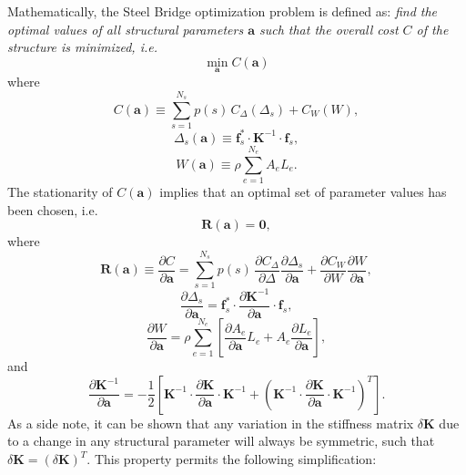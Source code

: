 \documentclass[12pt,a4paper,article]{memoir} %
\begin{document}
Mathematically, the Steel Bridge optimization problem is defined as: \textit{find the optimal values of all structural parameters $\mathbf{a}$ such that the overall cost $C$ of the structure is minimized, i.e.}
\begin{equation}
        \min_{\mathbf{a}} C(\mathbf{a})
\end{equation}
where
\begin{equation}
        C(\mathbf{a}) \equiv \sum_{s=1}^{N_s} p(s) \, C_{\Delta} (\Delta_s) + C_W (W),
\end{equation}
\begin{equation}
        \Delta_s (\mathbf{a}) \equiv \mathbf{f}^*_s \cdot \mathbf{K}^{-1} \cdot \mathbf{f}_s,
\end{equation}
\begin{equation}
        W (\mathbf{a}) \equiv \rho \sum_{e=1}^{N_e} A_e L_e.
\end{equation}
The stationarity of $C (\mathbf{a})$ implies that an optimal set of parameter values has been chosen, i.e.
\begin{equation}
        \mathbf{R} (\mathbf{a}) = \mathbf{0},
\end{equation}
where
\begin{equation}
        \mathbf{R} (\mathbf{a}) \equiv \frac{\partial C}{\partial \mathbf{a}} = \sum_{s=1}^{N_s} p(s) \, \frac{\partial C_\Delta}{\partial \Delta} \frac{\partial \Delta_s}{\partial \mathbf{a}} + \frac{\partial C_W}{\partial W} \frac{\partial W}{\partial \mathbf{a}},
\end{equation}
\begin{equation}
        \frac{\partial \Delta_s}{\partial \mathbf{a}} = \mathbf{f}^*_s \cdot \frac{\partial \mathbf{K}^{-1}}{\partial \mathbf{a}} \cdot \mathbf{f}_s,
\end{equation}
\begin{equation}
        \frac{\partial W}{\partial \mathbf{a}} = \rho \sum_{e=1}^{N_e} \left[ \frac{\partial A_e}{\partial \mathbf{a}} L_e + A_e \frac{\partial L_e}{\partial \mathbf{a}} \right],
\end{equation}
and
\begin{equation}
        \frac{\partial \mathbf{K}^{-1}}{\partial \mathbf{a}} = - \frac{1}{2} \left[ \mathbf{K}^{-1} \cdot \frac{\partial \mathbf{K}}{\partial \mathbf{a}} \cdot \mathbf{K}^{-1} + \left( \mathbf{K}^{-1} \cdot \frac{\partial \mathbf{K}}{\partial \mathbf{a}} \cdot \mathbf{K}^{-1} \right)^T \right].
\end{equation}
As a side note, it can be shown that any variation in the stiffness matrix $\delta \mathbf{K}$ due to a change in any structural parameter will always be symmetric, such that $\delta \mathbf{K} = (\delta \mathbf{K})^T$. This property permits the following simplification:
\end{document}

